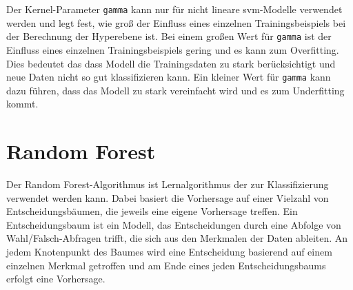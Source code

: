 Der Kernel-Parameter \texttt{gamma} kann nur für nicht lineare \gls{svm}-Modelle verwendet werden und legt fest, wie groß der Einfluss eines einzelnen Trainingsbeispiels bei der Berechnung der Hyperebene ist. Bei einem großen Wert für \texttt{gamma} ist der Einfluss eines einzelnen Trainingsbeispiels gering und es kann zum Overfitting. Dies bedeutet das dass Modell die Trainingsdaten zu stark berücksichtigt und neue Daten nicht so gut klassifizieren kann. Ein kleiner Wert für \texttt{gamma} kann dazu führen, dass das Modell zu stark vereinfacht wird und es zum Underfitting kommt.


\section{Random Forest}






Der Random Forest-Algorithmus ist Lernalgorithmus der zur Klassifizierung verwendet werden kann. Dabei basiert die Vorhersage auf einer Vielzahl von Entscheidungsbäumen, die jeweils eine eigene Vorhersage treffen. Ein Entscheidungsbaum ist ein Modell, das Entscheidungen durch eine Abfolge von Wahl/Falsch-Abfragen trifft, die sich aus den Merkmalen der Daten ableiten. An jedem Knotenpunkt des Baumes wird eine Entscheidung basierend auf einem einzelnen Merkmal getroffen und am Ende eines jeden Entscheidungsbaums erfolgt eine Vorhersage. 

